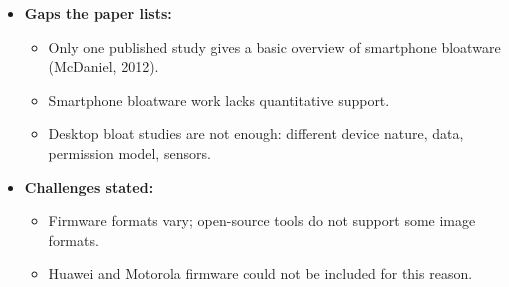 \documentclass[11pt,a4paper]{article}
\begin{document}
\begin{enumerate}
\begin{itemize}[leftmargin=*, itemsep=1pt, topsep=2pt]
        \item \textbf{Gaps the paper lists:}
        \begin{itemize}[itemsep=0pt]
            \item Only one published study gives a basic overview of smartphone bloatware (McDaniel, 2012).
            \item Smartphone bloatware work lacks quantitative support.
            \item Desktop bloat studies are not enough: different device nature, data, permission model, sensors.
        \end{itemize}
        \item \textbf{Challenges stated:}
        \begin{itemize}[itemsep=0pt]
            \item Firmware formats vary; open-source tools do not support some image formats.
            \item Huawei and Motorola firmware could not be included for this reason.
        \end{itemize}
    \end{itemize}


\end{enumerate}
\end{document}
